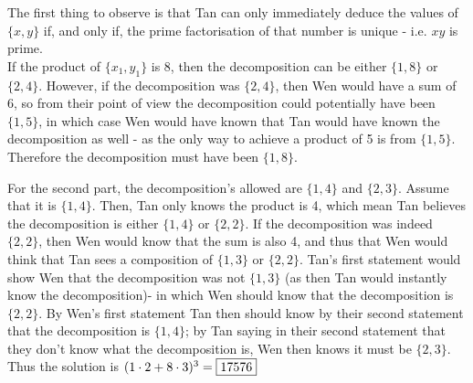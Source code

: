 \begin{solution}\hfil\medskip 
 
    The first thing to observe is that Tan can only immediately deduce the values of \(\{x,y\}\) if, and only if, the prime factorisation of that number is unique - i.e. \(xy\) is prime.\\
    If the product of $\{x_1,y_1\}$ is 8, then the decomposition can be either $\{1,8\}$ or $\{2,4\}$. 
    However, if the decomposition was $\{2,4\}$, then Wen would have a sum of 6, so from their point of view the decomposition could potentially have been $\{1,5\}$, in which case Wen would have known that Tan would have known the decomposition as well - as the only way to achieve a product of 5 is from $\{1,5\}$. 
    Therefore the decomposition must have been $\{1,8\}$.
     
    For the second part, the decomposition's allowed are $\{1,4\}$ and $\{2,3\}$. 
    Assume that it is $\{1,4\}$. 
    Then, Tan only knows the product is 4, which mean Tan believes the decomposition is either $\{1,4\}$ or $\{2,2\}$. 
    If the decomposition was indeed $\{2,2\}$, then Wen would know that the sum is also 4, and thus that Wen would think that Tan sees a composition of $\{1,3\}$ or $\{2,2\}$. 
    Tan's first statement would show Wen that the decomposition was not $\{1,3\}$ (as then Tan would instantly know the decomposition)- in which Wen should know that the decomposition is $\{2,2\}$. 
    By Wen's first statement Tan then should know by their second statement that the decomposition is $\{1,4\}$; by Tan saying in their second statement that they don't know what the decomposition is, Wen then knows it must be $\{2,3\}$. 
    Thus the solution is \((1\cdot2+8\cdot3)^3 =\fbox{17576}\)
\end{solution}